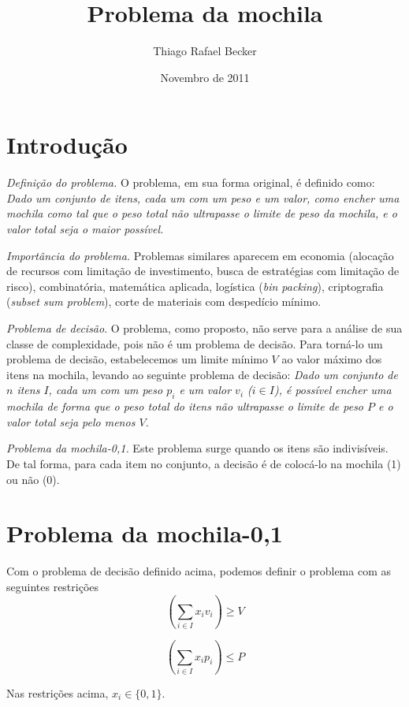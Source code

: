 \documentclass[a4paper]{article}
\title{Problema da mochila}
\date{Novembro de 2011}
\author{Thiago Rafael Becker}
\begin{document}
\maketitle
\section*{Introdução}
{\it Definição do problema.} O problema, em sua forma original, é definido como: {\it Dado um conjunto de itens, cada um com um peso e um valor, como encher uma mochila como tal que o 	peso total não ultrapasse o limite de peso da mochila, e o valor total seja o maior possível.}

{\it Importância do problema.} Problemas similares aparecem em economia (alocação de recursos com limitação de investimento, busca de estratégias com limitação de risco), combinatória, matemática aplicada, logística ({\it bin packing}), criptografia ({\it subset sum problem}), corte de materiais com despedício mínimo.

{\it Problema de decisão}. O problema, como proposto, não serve para a análise de sua classe de complexidade, pois não é um problema de decisão. Para torná-lo um problema de decisão, estabelecemos um limite mínimo $V$ ao valor máximo dos itens na mochila, levando ao seguinte problema de decisão: {\it Dado um conjunto de $n$ itens $I$, cada um com um peso $p_i$ e um valor $v_i$ ($i \in I$), é possível encher uma mochila de forma que o peso total do itens não ultrapasse o limite de peso $P$ e o valor total seja pelo menos $V$.}

{\it Problema da mochila-0,1.} Este problema surge quando os itens são indivisíveis. De tal forma, para cada item no conjunto, a decisão é de colocá-lo na mochila (1) ou não (0).

\section*{Problema da mochila-0,1}
Com o problema de decisão definido acima, podemos definir o problema com as seguintes restrições
\begin{equation}
\label{restricao:1}
\left(\sum_{i \in I} x_i v_i\right) \ge V
\end{equation}

\begin{equation}
\label{restricao:2}
\left(\sum_{i \in I} x_i p_i\right) \le P
\end{equation}

Nas restrições acima, $x_i \in \{0,1\}$.
\end{document}
